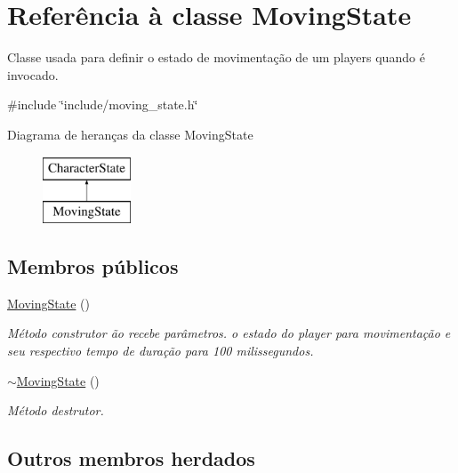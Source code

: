 \hypertarget{classMovingState}{}\section{Referência à classe Moving\+State}
\label{classMovingState}


Classe usada para definir o estado de movimentação de um players quando é invocado.  




{\ttfamily \#include \char`\"{}include/moving\+\_\+state.\+h\char`\"{}}

Diagrama de heranças da classe Moving\+State\begin{figure}[H]
\begin{center}
\leavevmode
\includegraphics[height=2.000000cm]{classMovingState}
\end{center}
\end{figure}
\subsection*{Membros públicos}
\begin{DoxyCompactItemize}
\item 
\mbox{\label{classMovingState_ad81c8034bc50f454d96e06689c1c4714}} 
\mbox{\hyperlink{classMovingState_ad81c8034bc50f454d96e06689c1c4714}{Moving\+State}} ()
\begin{DoxyCompactList}\small\item\em Método construtor ão recebe parâmetros.  o estado do player para movimentação e seu respectivo tempo de duração para 100 milissegundos. \end{DoxyCompactList}\item 
\mbox{\label{classMovingState_a5a615fe66d4becc9389471fbf8310fd1}} 
\mbox{\hyperlink{classMovingState_a5a615fe66d4becc9389471fbf8310fd1}{$\sim$\+Moving\+State}} ()
\begin{DoxyCompactList}\small\item\em Método destrutor. \end{DoxyCompactList}\end{DoxyCompactItemize}
\subsection*{Outros membros herdados}


